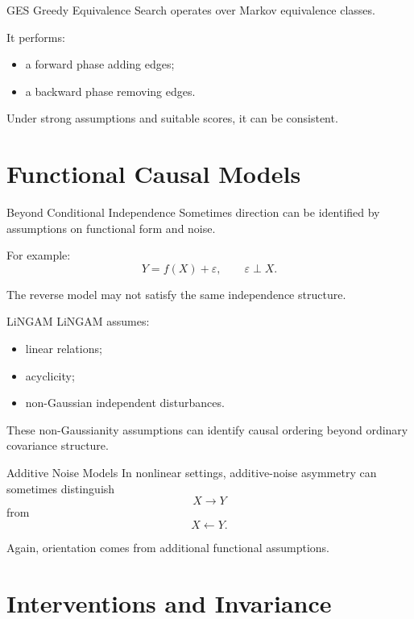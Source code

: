 \documentclass[aspectratio=169,11pt]{beamer}
\begin{document}
\begin{frame}{GES}
Greedy Equivalence Search operates over Markov equivalence classes.

It performs:
\begin{itemize}
\item a forward phase adding edges;
\item a backward phase removing edges.
\end{itemize}

Under strong assumptions and suitable scores, it can be consistent.
\end{frame}

\section{Functional Causal Models}

\begin{frame}{Beyond Conditional Independence}
Sometimes direction can be identified by assumptions on functional form and noise.

For example:
\[
Y=f(X)+\varepsilon,
\qquad
\varepsilon \perp X.
\]

The reverse model may not satisfy the same independence structure.
\end{frame}

\begin{frame}{LiNGAM}
LiNGAM assumes:
\begin{itemize}
\item linear relations;
\item acyclicity;
\item non-Gaussian independent disturbances.
\end{itemize}

These non-Gaussianity assumptions can identify causal ordering beyond ordinary covariance structure.
\end{frame}

\begin{frame}{Additive Noise Models}
In nonlinear settings, additive-noise asymmetry can sometimes distinguish
\[
X \rightarrow Y
\]
from
\[
X \leftarrow Y.
\]

Again, orientation comes from additional functional assumptions.
\end{frame}

\section{Interventions and Invariance}
\end{document}
